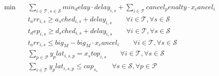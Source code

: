 \begin{align}
  \min\quad & \sum_{i \in \mathcal{T}, s \in \mathcal{S}} min_delay \cdot delay_{i,s} + \sum_{i \in \mathcal{T}} cancel_penalty \cdot x_cancel_{i} \tag{total_disruption_cost} \\
  & t_arr_{i,s} \ge a_sched_{i,s} + delay_{i,s} \qquad \forall i \in \mathcal{T}, \forall s \in \mathcal{S} \tag{arrival_relation} \\
  & t_dep_{i,s} \ge d_sched_{i,s} + delay_{i,s} \qquad \forall i \in \mathcal{T}, \forall s \in \mathcal{S} \tag{departure_relation} \\
  & t_arr_{i,s} \le big_M - big_M \cdot x_cancel_{i} \qquad \forall i \in \mathcal{T}, \forall s \in \mathcal{S} \tag{stop_consistency} \\
  & \sum_{p \in \mathcal{P}} y_plat_{i,s,p} = x_stop_{i,s} \qquad \forall i \in \mathcal{T}, \forall s \in \mathcal{S} \tag{platform_assignment_limit} \\
  & \sum_{i \in \mathcal{T}} y_plat_{i,s,p} \le cap_s_{s} \qquad \forall s \in \mathcal{S}, \forall p \in \mathcal{P} \tag{platform_capacity} \\
\end{align}